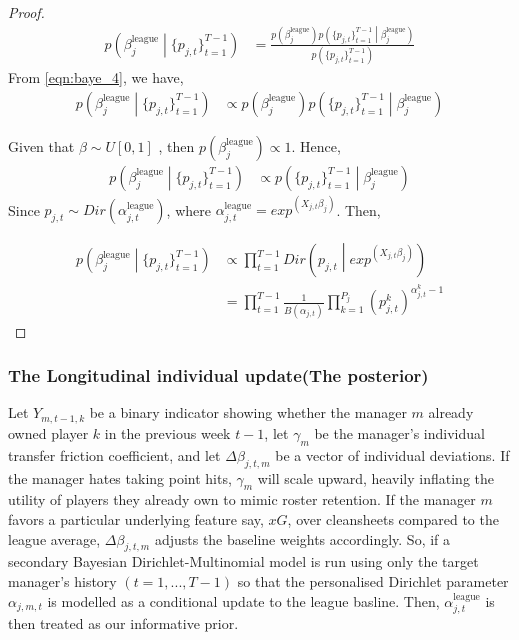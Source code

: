 \documentclass[12pt,oneside,a4paper]{book}
\theoremstyle{definition}
\theoremstyle{remark}
\begin{document}
				\begin{proof}
					\[
					\begin{aligned}
						p\left(\beta_j^{\text{league}} \middle| \{ p_{j,t}\}_{t=1}^{T-1}\right)
						& = \frac{p\left(\beta_j^{\text{league}}\right) p\left(\{ p_{j,t} \}_{t=1}^{T-1} \middle| \beta^{\text{league}}_j\right)}{p\left( \{ p_{j,t}\}_{t=1}^{T-1} \right)}
					\end{aligned}
					\]
					From \eqref{eqn:baye_4}, we have,
					\[
					\begin{aligned}
						p\left(\beta_j^{\text{league}} \middle| \{ p_{j,t}\}_{t=1}^{T-1}\right)
						 & \propto p\left(\beta_j^{\text{league}}\right) p\left(\{ p_{j,t} \}_{t=1}^{T-1} \middle| \beta^{\text{league}}_j\right)
					\end{aligned}
					\]

					Given that $\beta \sim U[0,1]$ , then $p\left(\beta_{j}^{\text{league}} \right) \propto 1$. Hence,
					\[
						\begin{aligned}
							p\left(\beta_j^{\text{league}} \middle| \{ p_{j,t}\}_{t=1}^{T-1}\right)
							& \propto p\left(\{ p_{j,t} \}_{t=1}^{T-1} \middle| \beta^{\text{league}}_j\right)
						\end{aligned}
					\]
					Since $p_{j,t} \sim Dir\left(\alpha^{\text{league}}_{j,t}\right)$, where $\alpha^{\text{league}}_{j,t} = exp^{\left(X_{j,t}\beta_{j}\right)}$. Then,

					\[
					\begin{aligned}
						p\left(\beta_j^{\text{league}} \middle| \{ p_{j,t}\}_{t=1}^{T-1}\right)
						& \propto \prod_{t=1}^{T-1} Dir\left( p_{j,t} \middle| exp^{\left(X_{j,t}\beta_{j}\right)}\right)\\
						& = \prod_{t=1}^{T-1} \frac{1}{B\left(\alpha_{j,t}\right)} \prod_{k=1}^{P_j}\left(p^k_{j,t}\right)^{\alpha^k_{j,t}-1}
					\end{aligned}
					\]\qedhere
				\end{proof}

				\subsubsection{The Longitudinal individual update(The posterior)}
				Let $Y_{m,t-1,k}$ be a binary indicator showing whether the manager $m$ already owned player $k$ in the previous week $t-1$, let $\gamma_m$ be the manager's individual transfer friction coefficient, and let $\Delta\beta_{j,t,m}$ be a vector of individual deviations. If the manager hates taking point hits, $\gamma_m$ will scale upward, heavily inflating the utility of players they already own to mimic roster retention. If the manager $m$ favors a particular underlying feature say, $xG$, over cleansheets compared to the league average, $\Delta\beta_{j,t,m}$ adjusts the baseline weights accordingly. So, if a secondary Bayesian Dirichlet-Multinomial model is run using only the target manager's history $(t=1, ..., T-1)$ so that the personalised Dirichlet parameter $\alpha_{j,m,t}$ is modelled as a conditional update to the league basline. Then, $\alpha_{j,t}^{\text{league}}$ is then treated as our informative prior.
\end{document}
